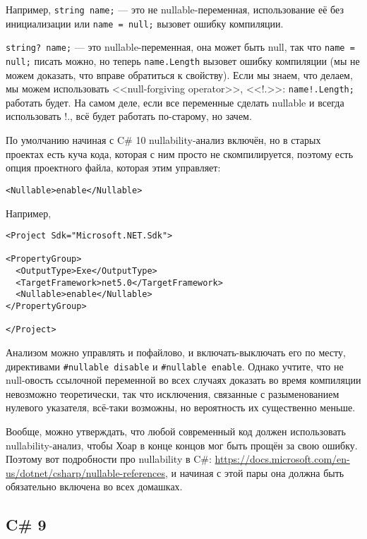 \documentclass{../../text-style}
\begin{document}
Например, \texttt{string name;} --- это не nullable-переменная, использование её без инициализации или \texttt{name = null;} вызовет ошибку компиляции. 

\texttt{string? name;} --- это nullable-переменная, она может быть null, так что \texttt{name = null;} писать можно, но теперь \texttt{name.Length} вызовет ошибку компиляции (мы не можем доказать, что вправе обратиться к свойству). Если мы знаем, что делаем, мы можем использовать <<null-forgiving operator>>, <<!.>>: \texttt{name!.Length;} работать будет. На самом деле, если все переменные сделать nullable и всегда использовать !., всё будет работать по-старому, но зачем.

По умолчанию начиная с C\# 10 nullability-анализ включён, но в старых проектах есть куча кода, которая с ним просто не скомпилируется, поэтому есть опция проектного файла, которая этим управляет:

\begin{verbatim}
<Nullable>enable</Nullable>
\end{verbatim}

Например,

\begin{verbatim}
<Project Sdk="Microsoft.NET.Sdk">

<PropertyGroup>
  <OutputType>Exe</OutputType>
  <TargetFramework>net5.0</TargetFramework>
  <Nullable>enable</Nullable>
</PropertyGroup>

</Project>
\end{verbatim}

Анализом можно управлять и пофайлово, и включать-выключать его по месту, директивами \texttt{#nullable disable} и \texttt{#nullable enable}. Однако учтите, что не null-овость ссылочной переменной во всех случаях доказать во время компиляции невозможно теоретически, так что исключения, связанные с разыменованием нулевого указателя, всё-таки возможны, но вероятность их существенно меньше.

Вообще, можно утверждать, что любой современный код должен использовать nullability-анализ, чтобы Хоар в конце концов мог быть прощён за свою ошибку. Поэтому вот подробности про nullability в C\#: \url{https://docs.microsoft.com/en-us/dotnet/csharp/nullable-references}, и начиная с этой пары она должна быть обязательно включена во всех домашках.

\subsection{C\# 9}
\end{document}
